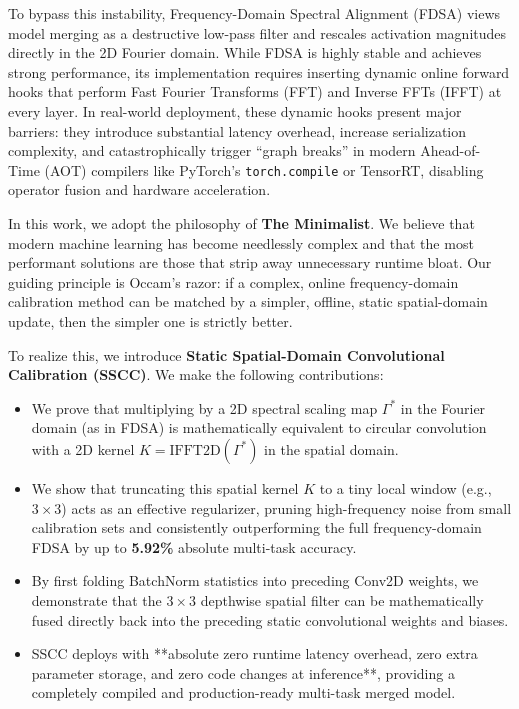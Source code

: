 \documentclass{article}
\theoremstyle{plain}
\theoremstyle{definition}
\theoremstyle{remark}
\begin{document}
To bypass this instability, Frequency-Domain Spectral Alignment (FDSA) \cite{anonymous2026lsc} views model merging as a destructive low-pass filter and rescales activation magnitudes directly in the 2D Fourier domain. While FDSA is highly stable and achieves strong performance, its implementation requires inserting dynamic online forward hooks that perform Fast Fourier Transforms (FFT) and Inverse FFTs (IFFT) at every layer. In real-world deployment, these dynamic hooks present major barriers: they introduce substantial latency overhead, increase serialization complexity, and catastrophically trigger ``graph breaks'' in modern Ahead-of-Time (AOT) compilers like PyTorch's \texttt{torch.compile} \cite{paszke2019pytorch} or TensorRT, disabling operator fusion and hardware acceleration.

In this work, we adopt the philosophy of \textbf{The Minimalist}. We believe that modern machine learning has become needlessly complex and that the most performant solutions are those that strip away unnecessary runtime bloat. Our guiding principle is Occam's razor: if a complex, online frequency-domain calibration method can be matched by a simpler, offline, static spatial-domain update, then the simpler one is strictly better.

To realize this, we introduce \textbf{Static Spatial-Domain Convolutional Calibration (SSCC)}. We make the following contributions:
\begin{itemize}
    \item We prove that multiplying by a 2D spectral scaling map $\Gamma^*$ in the Fourier domain (as in FDSA) is mathematically equivalent to circular convolution with a 2D kernel $K = \text{IFFT2D}(\Gamma^*)$ in the spatial domain.
    \item We show that truncating this spatial kernel $K$ to a tiny local window (e.g., $3 \times 3$) acts as an effective regularizer, pruning high-frequency noise from small calibration sets and consistently outperforming the full frequency-domain FDSA by up to \textbf{5.92\%} absolute multi-task accuracy.
    \item By first folding BatchNorm statistics into preceding Conv2D weights, we demonstrate that the $3 \times 3$ depthwise spatial filter can be mathematically fused directly back into the preceding static convolutional weights and biases.
    \item SSCC deploys with **absolute zero runtime latency overhead, zero extra parameter storage, and zero code changes at inference**, providing a completely compiled and production-ready multi-task merged model.
\end{itemize}
\end{document}
